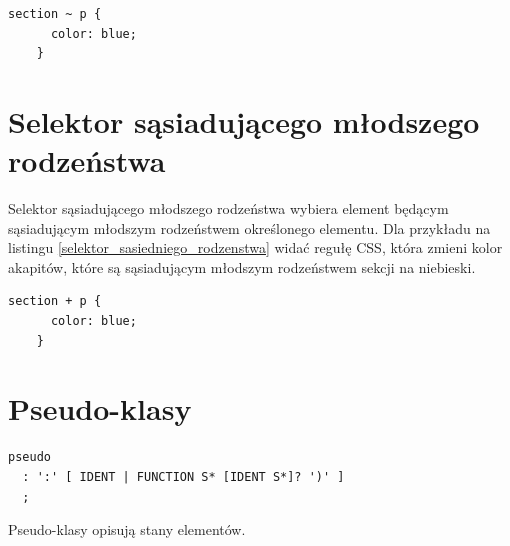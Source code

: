 \documentclass[a4paper,12pt]{book} %
\begin{document}
\begin{lstfloat}[hb]
  \lstset{language=HTML}
  \begin{lstlisting}[frame=single]
    section ~ p {
      color: blue;
    }\end{lstlisting}

  \caption{Reguła z selektorem wszystkich akapitów, umieszczonych za sekcją}
  \label{selektor_rodzenstwa}

\end{lstfloat}








\section{Selektor sąsiadującego młodszego rodzeństwa}
Selektor sąsiadującego młodszego rodzeństwa wybiera element będącym sąsiadującym młodszym rodzeństwem określonego elementu. Dla przykładu na listingu \ref{selektor_sasiedniego_rodzenstwa} widać regułę CSS, która zmieni kolor akapitów, które są sąsiadującym młodszym rodzeństwem sekcji na niebieski.




\begin{lstfloat}[hb]
  \lstset{language=HTML}
  \begin{lstlisting}[frame=single]
    section + p {
      color: blue;
    }\end{lstlisting}

  \caption{Reguła z selektorem akapitów, bezpośrednio poprzedzonych sekcją}
  \label{selektor_sasiedniego_rodzenstwa}

\end{lstfloat}








\section{Pseudo-klasy}
\begin{lstfloat}[hb]
  \lstset{language=HTML}
  \begin{lstlisting}[frame=single]
pseudo
  : ':' [ IDENT | FUNCTION S* [IDENT S*]? ')' ]
  ;
\end{lstlisting}
  \caption{Składnia pseudo-klasy CSS \cite{GrammarofCSS}}\label{pseudo_css}
\end{lstfloat}
Pseudo-klasy opisują stany elementów.
\end{document}
